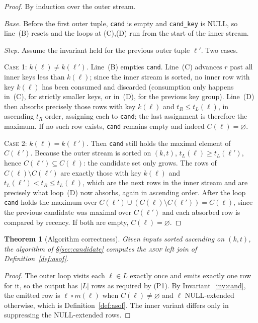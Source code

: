 \documentclass[11pt,a4paper]{report}
\theoremstyle{definition}
\theoremstyle{plain}
\newtheorem{theorem}[definition]{Theorem}
\newcommand{\code}[1]{\texttt{\small #1}}
\newcommand{\asof}{{\normalfont\scshape asof}}
\begin{document}
\begin{proof}[Proof]
By induction over the outer stream.

\emph{Base.} Before the first outer tuple, \code{cand} is empty and \code{cand\_key} is
NULL, so line~(B) resets and the loops at (C),(D) run from the start of the inner stream.

\emph{Step.} Assume the invariant held for the previous outer tuple $\ell'$. Two cases.

\textsc{Case 1: } $k(\ell) \neq k(\ell')$. Line~(B) empties \code{cand}. Line~(C) advances
$r$ past all inner keys less than $k(\ell)$; since the inner stream is sorted, no inner row
with key $k(\ell)$ has been consumed and discarded (consumption only happens in~(C), for
strictly smaller keys, or in~(D), for the previous key group). Line~(D) then absorbs
precisely those rows with key $k(\ell)$ and $t_R \le t_L(\ell)$, in ascending $t_R$ order,
assigning each to \code{cand}; the last assignment is therefore the maximum. If no such row
exists, \code{cand} remains empty and indeed $C(\ell) = \varnothing$.

\textsc{Case 2: } $k(\ell) = k(\ell')$. Then \code{cand} still holds the maximal element of
$C(\ell')$. Because the outer stream is sorted on $(k,t)$, $t_L(\ell) \ge t_L(\ell')$, hence
$C(\ell') \subseteq C(\ell)$: the candidate set only grows. The rows of
$C(\ell) \setminus C(\ell')$ are exactly those with key $k(\ell)$ and
$t_L(\ell') < t_R \le t_L(\ell)$, which are the next rows in the inner stream and are
precisely what loop~(D) now absorbs, again in ascending order. After the loop \code{cand}
holds the maximum over $C(\ell') \cup (C(\ell)\setminus C(\ell')) = C(\ell)$, since the
previous candidate was maximal over $C(\ell')$ and each absorbed row is compared by
recency. If both are empty, $C(\ell) = \varnothing$.
\end{proof}

\begin{theorem}[Algorithm correctness]
Given inputs sorted ascending on $(k,t)$, the algorithm of \S\ref{sec:candidate} computes
the \asof{} left join of Definition~\ref{def:asof}.
\end{theorem}
\begin{proof}
The outer loop visits each $\ell \in L$ exactly once and emits exactly one row for it, so
the output has $|L|$ rows as required by (P1). By Invariant~\ref{inv:cand}, the emitted row
is $\ell \circ m(\ell)$ when $C(\ell) \neq \varnothing$ and $\ell$ NULL-extended otherwise,
which is Definition~\ref{def:asof}. The inner variant differs only in suppressing the
NULL-extended rows.
\end{proof}
\end{document}
